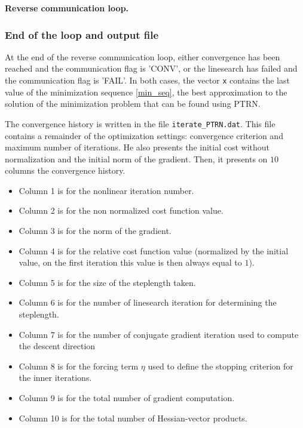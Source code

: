 \documentclass[a4paper,twoside,final,onecolumn,11pt,openright]{article}
\begin{document}
\framebox{
\small
 
}
\normalsize
\begin{center}
\textbf{Reverse communication loop.} 
\end{center}

\subsubsection{End of the loop and output file}
At the end of the reverse communication loop, either convergence has been reached and the communication flag is 'CONV', or the linesearch has failed and the communication flag is 'FAIL'. In both cases, the vector \texttt{x} contains the last value of the minimization sequence \eqref{min_seq}, the best approximation to the solution of the minimization problem that can be found using PTRN. 

The convergence history is written in the file \texttt{iterate\_PTRN.dat}. This file contains a remainder of the optimization settings: convergence criterion and maximum number of iterations. He also presents the initial cost without normalization and the initial norm of the gradient. Then, it presents on $10$ columns the convergence history. 
\begin{itemize}
\item Column 1 is for the nonlinear iteration number.
\item Column 2 is for the non normalized cost function value.
\item Column 3 is for the norm of the gradient.
\item Column 4 is for the relative cost function value (normalized by the initial value, on the first iteration this value is then always equal to $1$).
\item Column 5 is for the size of the steplength taken.
\item Column 6 is for the number of linesearch iteration for determining the steplength.
\item Column 7 is for the number of conjugate gradient iteration used to compute the descent direction
\item Column 8 is for the forcing term $\eta$ used to define the stopping criterion for the inner iterations. 
\item Column 9 is for the total number of gradient computation.
\item Column 10 is for the total number of Hessian-vector products.
\end{itemize}
\end{document}
